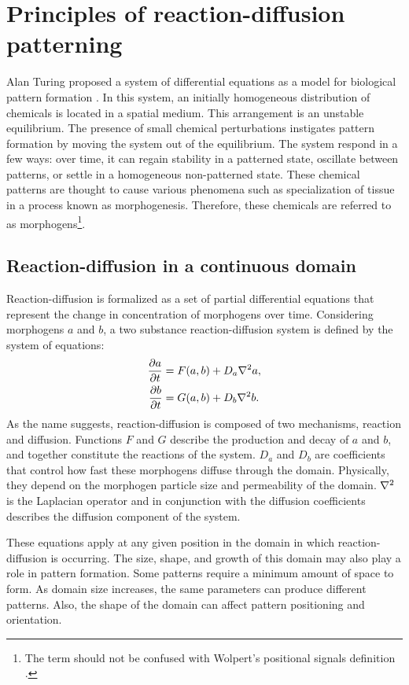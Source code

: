 \chapter{Principles of reaction-diffusion patterning} 
Alan Turing proposed a system of differential equations as a model for biological pattern formation \citep{turing1952}. In this system, an initially homogeneous distribution of chemicals is located in a spatial medium. This arrangement is an unstable equilibrium. The presence of small chemical perturbations instigates pattern formation by moving the system out of the equilibrium. The system respond in a few ways: over time, it can regain stability in a patterned state, oscillate between patterns, or settle in a homogeneous non-patterned state. These chemical patterns are thought to cause various phenomena such as specialization of tissue in a process known as morphogenesis. Therefore, these chemicals are referred to as morphogens\footnote{The term  should not be confused with Wolpert’s positional signals definition \citep{wolpert1996}.}.

\section{Reaction-diffusion in a continuous domain}
Reaction-diffusion is formalized as a set of partial differential equations that represent the change in concentration of morphogens over time. Considering morphogens $a$ and $b$, a two substance reaction-diffusion system is defined by the system of equations:
	\begin{equation}
	\begin{aligned} \label{eq:basicRD}
		\frac{\partial a}{\partial t} &= F(a, b) + D_a \nabla^2 a,\\
		\frac{\partial b}{\partial t} &= G(a, b) + D_b \nabla^2 b.
	\end{aligned}
	\end{equation}
As the name suggests, reaction-diffusion is composed of two mechanisms, reaction and diffusion. Functions $F$ and $G$ describe the production and decay of $a$ and $b$, and together constitute the reactions of the system. $D_a$ and $D_b$ are coefficients that control how fast these morphogens diffuse through the domain. Physically, they depend on the morphogen particle size and permeability of the domain. $\nabla^2{}$ is the Laplacian operator and in conjunction with the diffusion coefficients describes the diffusion component of the system.

These equations apply at any given position in the domain in which reaction-diffusion is occurring. The size, shape, and growth of this domain may also play a role in pattern formation. Some patterns require a minimum amount of space to form. As domain size increases, the same parameters can produce different patterns. Also, the shape of the domain can affect pattern positioning and orientation.

